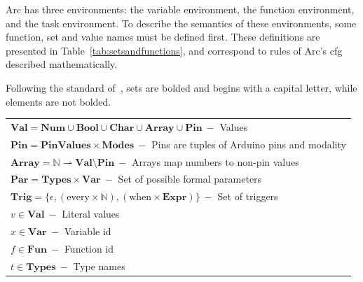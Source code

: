 Arc has three environments: the variable environment, the function environment, and the task environment. To describe the semantics of these environments, some function, set and value names must be defined first. These definitions are presented in Table~\ref{tab:setsandfunctions}, and correspond to rules of Arc's \gls{cfg} described mathematically.

Following the standard of~\cite{Huttel2010}, sets are bolded and begins with a capital letter, while elements are not bolded.


\begin{table}[htb!]
    \centering
    \begin{tabular}{l}
        \toprule
        $\textbf{Val} = \textbf{Num} \cup \textbf{Bool} \cup \textbf{Char} \cup \textbf{Array} \cup \textbf{Pin}\ -$ Values                                            \\
        $\textbf{Pin} = \textbf{PinValues} \times \textbf{Modes}\ -$ Pins are tuples of Arduino pins and modality                                                      \\
        $\textbf{Array} = \mathbb{N} \rightharpoonup \textbf{Val} \setminus \textbf{Pin}\ -$ Arrays map numbers to non-pin values                                      \\
        $\textbf{Par} = \textbf{Types} \times \textbf{Var}\ -$ Set of possible formal parameters                                                                       \\
        $\textbf{Trig} = \{\epsilon, (\text{every} \times \mathbb{N}), (\text{when} \times \textbf{Expr}) \}\ -$ Set of triggers                                       \\
        $v \in \textbf{Val}\ -$ Literal values                                                                                                                         \\
        $x \in \textbf{Var}\ -$ Variable id                                                                                                                            \\
        $f \in \textbf{Fun}\ -$ Function id                                                                                                                            \\
        $t \in \textbf{Types}\ -$ Type names                                                                                                                           \\

\end{tabular}
\end{table}
